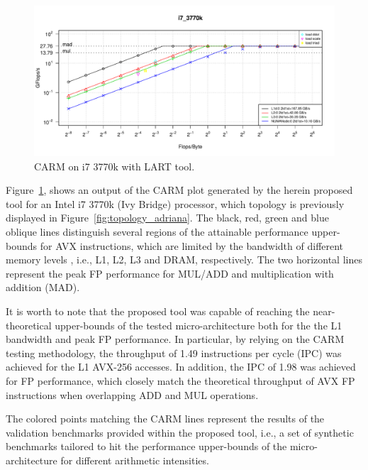 \documentclass[twoside,twocolumn,9pt]{extarticle}
\begin{document}
\begin{figure}
  \includegraphics[width=\textwidth]{pictures/roofline_model.pdf}
  \caption{CARM on i7 3770k with LART tool.}
  \label{fig:LART_adriana}
\end{figure}

Figure~\ref{fig:LART_adriana}, shows an output of the CARM plot generated by the herein proposed tool for an Intel i7
3770k (Ivy Bridge) processor, which topology is previously displayed in Figure~\ref{fig:topology_adriana}.
The black, red, green and blue oblique lines distinguish several regions of the attainable performance upper-bounds for AVX
instructions, which are limited by the bandwidth of different memory levels , i.e., L1, L2, L3 and DRAM, respectively.
The two horizontal lines represent the peak FP performance for MUL/ADD and multiplication with addition (MAD). 

It is worth to note that the proposed tool was capable of reaching the near-theoretical upper-bounds of the tested
micro-architecture both for the the L1 bandwidth and peak FP performance.  In particular, by relying on the CARM testing
methodology,  the throughput of 1.49 instructions per cycle (IPC) was achieved for the  L1 AVX-256 accesses. In addition, the
IPC of 1.98 was achieved for FP performance, which closely match the theoretical throughput of AVX FP instructions when overlapping
ADD and MUL operations.

The colored points matching the CARM lines represent the results of the validation benchmarks provided within the proposed tool,
i.e., a set of synthetic benchmarks tailored to hit the performance upper-bounds of the micro-architecture for different
arithmetic intensities.
\end{document}
